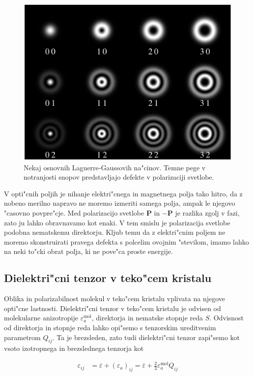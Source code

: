 \documentclass[a4paper,10pt]{article}
\renewcommand{\vec}{\mathbf}
\begin{document}
\begin{figure}[h]
 \centering
 \includegraphics[width=.6\textwidth]{./Slike/LG-wiki}
 \caption{Nekaj osnovnih Laguerre-Gaussovih na"cinov. Temne pege v notranjosti snopov predstavljajo defekte v polarizaciji svetlobe. \cite{lg-wiki}}
 \label{fig:laguerre-gauss}
\end{figure}


V opti"cnih poljih je nihanje elektri"cnega in magnetnega polja tako hitro, da z nobeno merilno napravo ne moremo izmeriti samega polja, ampak le njegovo "casovno povpre"cje. 
Med polarizacijo svetlobe $\vec P$ in $-\vec P$ je razlika zgolj v fazi, zato ju lahko obravnavamo kot enaki. 
V tem smislu je polarizacija svetlobe podobna nematskemu direktorju. 
Kljub temu da z elektri"cnim poljem ne moremo skonstruirati pravega defekta s polcelim ovojnim "stevilom, imamo lahko na neki to"cki obrat polja, ki ne pove"ca proste energije. 

\subsection{Dielektri"cni tenzor v teko"cem kristalu}
\label{sec:dielektricnost}
Oblika in polarizabilnost molekul v teko"cem kristalu vplivata na njegove opti"cne lastnosti. 
Dielektri"cni tenzor v teko"cem kristalu je odvisen od molekularne anizotropije $\varepsilon_{a}^{\mathrm{mol}}$, direktorja in nematske stopnje reda $S$. 
Odvisnost od direktorja in stopnje reda lahko opi"semo s tenzorskim ureditvenim parametrom $Q_{ij}$. 
Ta je brezsleden, zato tudi dielektri"cni tenzor zapi"semo kot vsoto izotropnega in brezslednega tenzorja kot\cite{degennes, ravnik-zumer-ldg}

\begin{align}
\label{eq:dielektricni-tenzor}
 \varepsilon_{ij} &= \overline\varepsilon + (\varepsilon_a)_{ij} = \overline\varepsilon + \frac{2}{3}\varepsilon_a^{\mathrm{mol}} Q_{ij}
\end{align}
\end{document}
